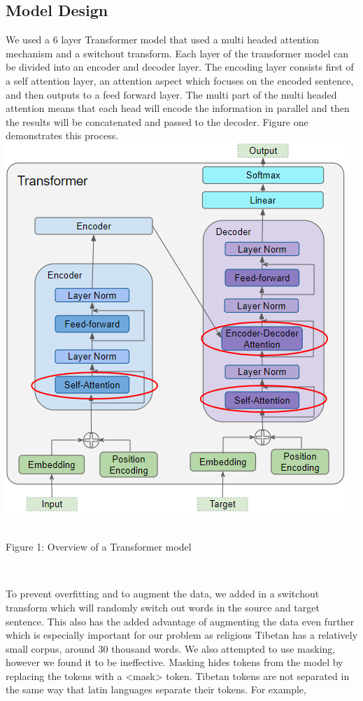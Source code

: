 \documentclass[letterpaper, 12 pt, conference]{ieeeconf}  %
\begin{document}
\subsection{Model Design}
We used a 6 layer Transformer model that used a multi headed attention mechanism and a switchout transform. Each layer of the transformer model can be divided into an encoder and decoder layer. The encoding layer consists first of a self attention layer, an attention aspect which focuses on the encoded sentence, and then outputs to a feed forward layer. The multi part of the multi headed attention means that each head will encode the information in parallel and then the results will be concatenated and passed to the decoder. Figure one demonstrates this process.
\includegraphics[scale=.4]{Transformer.png}
\caption{\\Figure 1: Overview of a Transformer model \cite{11}}
\\
\par
To prevent overfitting and to augment the data, we added in a switchout transform which will randomly switch out words in the source and target sentence. This also has the added advantage of augmenting the data even further which is especially important for our problem as religious Tibetan has a relatively small corpus, around 30 thousand words. We also attempted to use masking, however we found it to be ineffective. Masking hides tokens from the model by replacing the tokens with a <mask> token. Tibetan tokens are not separated in the same way that latin languages separate their tokens. For example,
\end{document}
